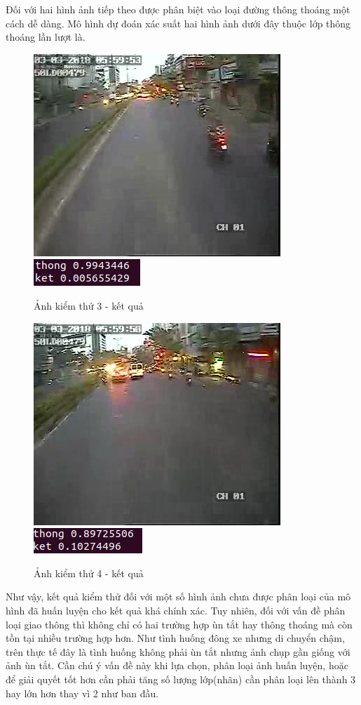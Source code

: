 	\pagebreak
	Đối với hai hình ảnh tiếp theo được phân biệt vào loại đường thông thoáng một cách dễ dàng. Mô hình dự đoán xác suất hai hình ảnh dưới đây thuộc lớp thông thoáng lần lượt là.
	\pagebreak
	\begin{figure}[h!]
		\centering
		\includegraphics[scale=1]{charts/image0125.jpg}
		\includegraphics[scale=0.5]{charts/most-last-res.png}
		\caption{Ảnh kiểm thử 3 - kết quả}
		\label{fig:test3}
	\end{figure}
	
	
	\begin{figure}[h!]
		\centering
		\includegraphics[scale=1]{charts/image0126.jpg}
		\includegraphics[scale=0.5]{charts/last-res.png}
		\caption{Ảnh kiểm thử 4 - kết quả}
		\label{fig:test4}
	\end{figure}
	\pagebreak
	Như vậy, kết quả kiểm thử đối với một số hình ảnh chưa được phân loại của mô hình đã huấn luyện cho kết quả khá chính xác. Tuy nhiên, đối với vấn đề  phân loại giao thông thì không chỉ có hai trường hợp ùn tắt hay thông thoáng mà còn tồn tại nhiều trường hợp hơn. Như tình huống đông xe nhưng di chuyển chậm, trên thực tế đây là tình huống không phải ùn tắt nhưng ảnh chụp gần giống với ảnh ùn tắt. Cần chú ý vấn đề này khi lựa chọn, phân loại ảnh huấn luyện, hoặc để giải quyết tốt hơn cần phải tăng số lượng lớp(nhãn) cần phân loại lên thành 3 hay lớn hơn thay vì 2 như ban đầu.
	
	
	